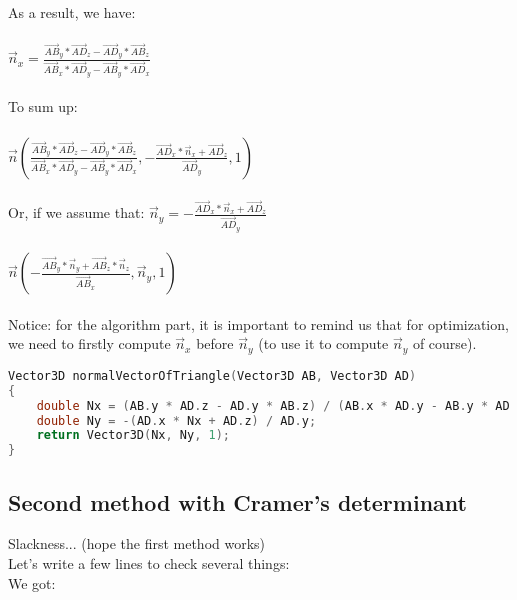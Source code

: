 \documentclass{article}
\begin{document}
			As a result, we have:\\\\
			
			$\vec{n}_x = \frac{\overrightarrow{AB}_y * \overrightarrow{AD}_z - \overrightarrow{AD}_y * \overrightarrow{AB}_z}{\overrightarrow{AB}_x * \overrightarrow{AD}_y - \overrightarrow{AB}_y * \overrightarrow{AD}_x}$\\\\
			
			To sum up:\\\\
			
			$\vec{n}\left(\frac{\overrightarrow{AB}_y * \overrightarrow{AD}_z - \overrightarrow{AD}_y * \overrightarrow{AB}_z}{\overrightarrow{AB}_x * \overrightarrow{AD}_y - \overrightarrow{AB}_y * \overrightarrow{AD}_x}, - \frac{\overrightarrow{AD}_x * \vec{n}_x + \overrightarrow{AD}_z}{\overrightarrow{AD}_y}, 1\right)$\\\\
			
			Or, if we assume that: $\vec{n}_y = - \frac{\overrightarrow{AD}_x * \vec{n}_x + \overrightarrow{AD}_z}{\overrightarrow{AD}_y}$\\\\
			
			$\vec{n}\left(- \frac{\overrightarrow{AB}_y * \vec{n}_y + \overrightarrow{AB}_z * \vec{n}_z}{\overrightarrow{AB}_x}, \vec{n}_y, 1\right)$\\\\
			
			Notice: for the algorithm part, it is important to remind us that for optimization, we need to firstly compute $\vec{n}_x$ before $\vec{n}_y$ (to use it to compute $\vec{n}_y$ of course).\\
			
			\begin{lstlisting}[language=C++, caption={Here is the implementation in C++ to compute $\vec{n}$}]
Vector3D normalVectorOfTriangle(Vector3D AB, Vector3D AD)
{
	double Nx = (AB.y * AD.z - AD.y * AB.z) / (AB.x * AD.y - AB.y * AD.x);
	double Ny = -(AD.x * Nx + AD.z) / AD.y;
	return Vector3D(Nx, Ny, 1);
}
		\end{lstlisting}
		
		\subsection{Second method with Cramer's determinant}
	
			Slackness... (hope the first method works)\\
			Let's write a few lines to check several things:\\
			We got:\\\\
			
\end{document}
